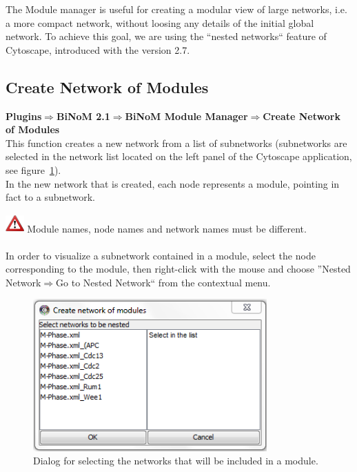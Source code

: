 The Module manager is useful for creating a modular view of large networks, i.e.
a more compact network,  without loosing any details of the initial global
network. To achieve this goal, we are using the ``nested networks`` feature of Cytoscape, introduced with the version 2.7.

\subsection{Create Network of Modules}
\textbf{Plugins$\Rightarrow$BiNoM 2.1$\Rightarrow$BiNoM Module Manager$\Rightarrow$Create Network of Modules}\\
This function creates a new network from a list of subnetworks (subnetworks are selected in the network list located on the left panel of the Cytoscape application, see figure~\ref{Create_network_of_modules}).\\
In the new network that is created, each node represents a module, pointing in fact to a subnetwork. 

\includegraphics[width=20pt,height=20pt]{graphics/warning} Module names, node names and network names must be different.\\\\

In order to visualize a subnetwork contained in a module, select the node
corresponding to the module, then right-click with the mouse and choose ''Nested
Network$\Rightarrow$Go to Nested Network`` from the contextual menu.

\begin{figure}
\centering
\includegraphics[width=0.8\textwidth]{graphics/Create_network_of_modules}
\caption{Dialog for selecting the networks that will be included in a module.}
\label{Create_network_of_modules}
\end{figure}

